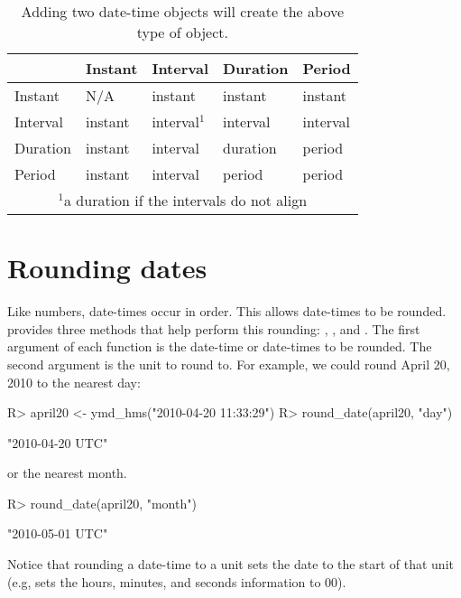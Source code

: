 \documentclass[article]{jss}
\begin{document}
\begin{table}
  \begin{center}
  \begin{tabular}{lllll}
  \toprule
  & Instant & Interval & Duration & Period\\
  \midrule
  Instant & N/A & instant & instant & instant\\
  Interval & instant & interval$^{1}$ & interval & interval\\
  Duration & instant & interval & duration & period\\
  Period & instant & interval & period & period\\
  \bottomrule
  \multicolumn{5}{c}{\footnotesize{$^{1}$a duration if the intervals do not align}}\\

  \end{tabular}
  \end{center}
  \caption{Adding two date-time objects will create the above type of object.}
  \label{tbl:date-math}
\end{table}

\section{Rounding dates}
\label{sec:rounding}
Like numbers, date-times occur in order. This allows date-times to be rounded.  provides three methods that help perform this rounding: , , and . The first argument of each function is the date-time or date-times to be rounded. The second argument is the unit to round to. For example, we could round April 20, 2010 to the nearest day:

\begin{CodeInput}
R> april20 <- ymd_hms("2010-04-20 11:33:29")
R> round_date(april20, "day")
\end{CodeInput}
\begin{CodeOutput}
[1] "2010-04-20 UTC"
\end{CodeOutput}

or the nearest month.

\begin{CodeInput}
R> round_date(april20, "month")
\end{CodeInput}
\begin{CodeOutput}
[1] "2010-05-01 UTC"
\end{CodeOutput}

Notice that rounding a date-time to a unit sets the date to the start of that unit (e.g,  sets the hours, minutes, and seconds information to 00).
\end{document}
